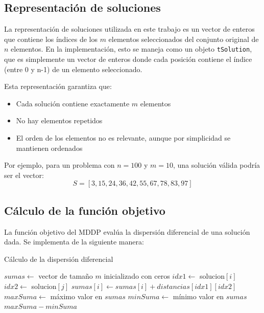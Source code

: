 \documentclass{article}
\begin{document}
\subsection{Representación de soluciones}

La representación de soluciones utilizada en este trabajo es un vector de enteros que contiene los índices de los \(m\) elementos seleccionados del conjunto original de \(n\) elementos. En la implementación, esto se maneja como un objeto \texttt{tSolution}, que es simplemente un vector de enteros donde cada posición contiene el índice (entre 0 y n-1) de un elemento seleccionado.

Esta representación garantiza que:
\begin{itemize}
    \item Cada solución contiene exactamente \(m\) elementos
    \item No hay elementos repetidos
    \item El orden de los elementos no es relevante, aunque por simplicidad se mantienen ordenados
\end{itemize}

Por ejemplo, para un problema con \(n=100\) y \(m=10\), una solución válida podría ser el vector:
\[S = [3, 15, 24, 36, 42, 55, 67, 78, 83, 97]\]

\subsection{Cálculo de la función objetivo}

La función objetivo del MDDP evalúa la dispersión diferencial de una solución dada. Se implementa de la siguiente manera:

\begin{algorithm}
\caption{Cálculo de la dispersión diferencial}
\begin{algorithmic}[1]
    \State $sumas \gets$ vector de tamaño $m$ inicializado con ceros
                \State $idx1 \gets$ solucion$[i]$
                \State $idx2 \gets$ solucion$[j]$
                \State $sumas[i] \gets sumas[i] + distancias[idx1][idx2]$
            \EndIf
        \EndFor
    \EndFor
    \State $maxSuma \gets$ máximo valor en $sumas$
    \State $minSuma \gets$ mínimo valor en $sumas$
    \State \Return $maxSuma - minSuma$
\EndFunction
\end{algorithmic}
\end{algorithm}
\end{document}
